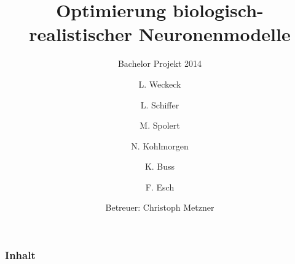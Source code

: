 \documentclass[12pt]{beamer}
\title{Optimierung biologisch-realistischer Neuronenmodelle}
\subtitle{Bachelor Projekt 2014}
\author{L. Weckeck \and L. Schiffer \and M. Spolert \and N. Kohlmorgen \and K. Buss \and F. Esch}
\institute{
  Institut für Robotik und Kognitive Systeme\\
  Universität zu Lübeck
}
\date{Betreuer: Christoph Metzner}
\begin{document}
\begin{frame}
  \titlepage
\end{frame}

\begin{frame}[shrink]
  \frametitle{Inhalt}
  \tableofcontents
\end{frame}




\end{document}
